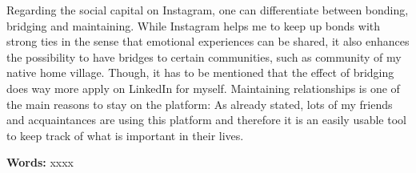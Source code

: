 \documentclass[11pt,letterpaper]{article}
\begin{document}
Regarding the social capital on Instagram, one can differentiate between bonding, bridging and maintaining. While Instagram helps me to keep up bonds with strong ties in the sense that emotional experiences can be shared, it also enhances the possibility to have bridges to certain communities, such as community of my native home village. Though, it has to be mentioned that the effect of bridging does way more apply on LinkedIn for myself. Maintaining relationships is one of the main reasons to stay on the platform: As already stated, lots of my friends and acquaintances are using this platform and therefore it is an easily usable tool to keep track of what is important in their lives. \newline


\noindent \textbf{Words:} xxxx

\newpage

\printbibliography

\newpage
\end{document}
